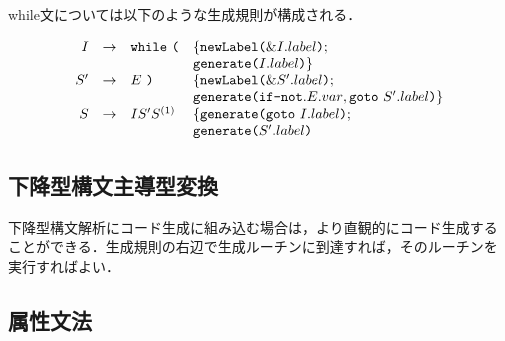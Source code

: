 \documentclass[dvipdfmx,a4j]{jbook}
\begin{document}
while文については以下のような生成規則が構成される．

 \[\begin{array}{rcll}
  I & \rightarrow & \texttt{while}\ \texttt{(} & \{\texttt{newLabel(}\& I.label\texttt{)};\\
    & & & \texttt{generate(}{I.label}\texttt{)}\}\\
  S' & \rightarrow & E\ \texttt{)} & \{\texttt{newLabel(}\& S'.label\texttt{)};\\
    & & & \texttt{generate(}{\texttt{if-not}}.{E.var},{\texttt{goto}\ S'.label}\texttt{)}\}\\
  S & \rightarrow & IS'S^{(1)} & \{\texttt{generate(}{\texttt{goto}\ I.label}\texttt{)};\\
    & & & \texttt{generate(}{S'.label}\texttt{)}
 \end{array}\]

\subsection{下降型構文主導型変換}

下降型構文解析にコード生成に組み込む場合は，より直観的にコード生成する
ことができる．生成規則の右辺で生成ルーチンに到達すれば，そのルーチンを
実行すればよい．

\subsection{属性文法}



\end{document}
